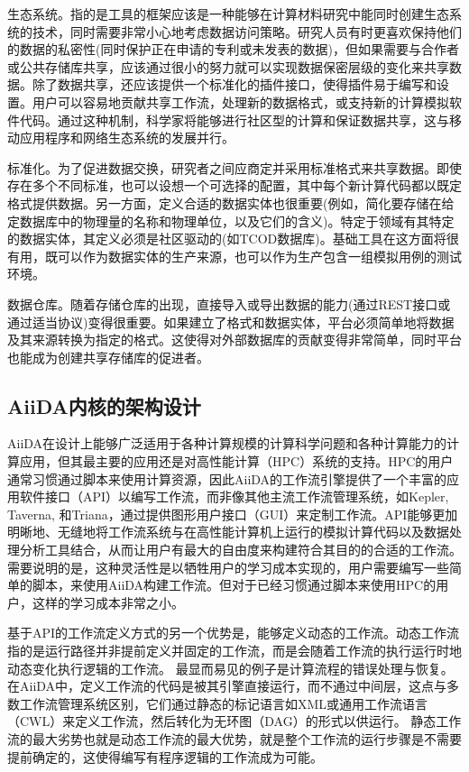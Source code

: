 \begin{alphaenum}
    \item 生态系统。指的是工具的框架应该是一种能够在计算材料研究中能同时创建生态系统的技术，同时需要非常小心地考虑数据访问策略。研究人员有时更喜欢保持他们的数据的私密性(同时保护正在申请的专利或未发表的数据)，但如果需要与合作者或公共存储库共享，应该通过很小的努力就可以实现数据保密层级的变化来共享数据。除了数据共享，还应该提供一个标准化的插件接口，使得插件易于编写和设置。用户可以容易地贡献共享工作流，处理新的数据格式，或支持新的计算模拟软件代码。通过这种机制，科学家将能够进行社区型的计算和保证数据共享，这与移动应用程序和网络生态系统的发展并行。
    \item 标准化。为了促进数据交换，研究者之间应商定并采用标准格式来共享数据\cite{murray2003chemical}。即使存在多个不同标准，也可以设想一个可选择的配置，其中每个新计算代码都以既定格式提供数据。另一方面，定义合适的数据实体也很重要(例如，简化要存储在给定数据库中的物理量的名称和物理单位，以及它们的含义)。特定于领域有其特定的数据实体，其定义必须是社区驱动的(如TCOD\cite{merkys2017posteriori}数据库)。基础工具在这方面将很有用，既可以作为数据实体的生产来源，也可以作为生产包含一组模拟用例的测试环境。
    \item 数据仓库。随着存储仓库的出现，直接导入或导出数据的能力(通过REST接口或通过适当协议)变得很重要。如果建立了格式和数据实体，平台必须简单地将数据及其来源转换为指定的格式。这使得对外部数据库的贡献变得非常简单，同时平台也能成为创建共享存储库的促进者。
\end{alphaenum}

\subsection{AiiDA内核的架构设计}

AiiDA在设计上能够广泛适用于各种计算规模的计算科学问题和各种计算能力的计算应用，但其最主要的应用还是对高性能计算（HPC）系统的支持。HPC的用户通常习惯通过脚本来使用计算资源，因此AiiDA的工作流引擎提供了一个丰富的应用软件接口（API）以编写工作流，而非像其他主流工作流管理系统，如Kepler\cite{altintas2004kepler}, Taverna\cite{oinn2004taverna},  和Triana\cite{taylor2003triana}，通过提供图形用户接口（GUI）来定制工作流。API能够更加明晰地、无缝地将工作流系统与在高性能计算机上运行的模拟计算代码以及数据处理分析工具结合，从而让用户有最大的自由度来构建符合其目的的合适的工作流。需要说明的是，这种灵活性是以牺牲用户的学习成本实现的，用户需要编写一些简单的脚本，来使用AiiDA构建工作流。但对于已经习惯通过脚本来使用HPC的用户，这样的学习成本非常之小。

基于API的工作流定义方式的另一个优势是，能够定义动态的工作流。动态工作流指的是运行路径并非提前定义并固定的工作流，而是会随着工作流的执行运行时地动态变化执行逻辑的工作流。
最显而易见的例子是计算流程的错误处理与恢复。在AiiDA中，定义工作流的代码是被其引擎直接运行，而不通过中间层，这点与多数工作流管理系统区别，它们通过静态的标记语言如XML或通用工作流语言（CWL）\cite{amstutz2016common}来定义工作流，然后转化为无环图（DAG）的形式以供运行。
静态工作流的最大劣势也就是动态工作流的最大优势，就是整个工作流的运行步骤是不需要提前确定的，这使得编写有程序逻辑的工作流成为可能。

